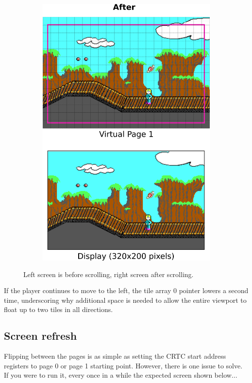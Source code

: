 \documentclass[book.tex]{subfiles}
\begin{document}
\begin{figure}[H]
\begin{subfigure}{.5\textwidth}
\end{subfigure}%
\begin{subfigure}{.5\textwidth}
\centering
  \includegraphics[width=.95\linewidth]{screenshots_300dpi/game/Scroll_KC4_6_2.png}
\end{subfigure}
\caption{Left screen is before scrolling, right screen after scrolling.}
\label{fig:kc4_6_scroll}
\end{figure}

\par
If the player continues to move to the left, the tile array 0 pointer lowers a second time, underscoring why additional space is needed to allow the entire viewport to float up to two tiles in all directions.\\

\subsection{Screen refresh} 
Flipping between the pages is as simple as setting the CRTC start address registers to page 0 or page 1 starting point. However, there is one issue to solve. If you were to run it, every once in a while the expected screen shown below...
\end{document}

